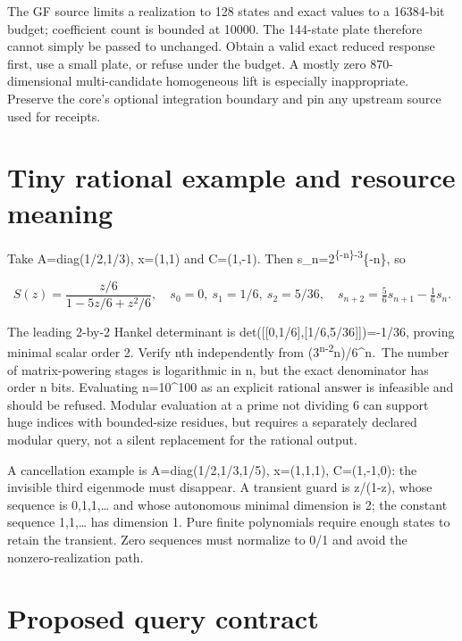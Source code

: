 \documentclass[
  11pt,
  a4paper,
]{report}
\let\nxtexttt\texttt
\renewcommand{\texttt}[1]{\nxtexttt{\seqsplit{#1}}}
\begin{document}
The GF source limits a realization to 128 states and exact values to a
16384-bit budget; coefficient count is bounded at 10000. The 144-state
plate therefore cannot simply be passed to \texttt{from\_state}
unchanged. Obtain a valid exact reduced response first, use a small
plate, or refuse under the budget. A mostly zero 870-dimensional
multi-candidate homogeneous lift is especially inappropriate. Preserve
the core's optional integration boundary and pin any upstream source
used for receipts.

\hypertarget{tiny-rational-example-and-resource-meaning}{%
\section{Tiny rational example and resource
meaning}\label{tiny-rational-example-and-resource-meaning}}

Take A=diag(1/2,1/3), x=(1,1) and C=(1,-1). Then
s\_n=2\textsuperscript{\{-n\}-3}\{-n\}, so

\[
S(z)=\frac{z/6}{1-5z/6+z^2/6},\quad s_0=0,\ s_1=1/6,\ s_2=5/36,
\quad s_{n+2}=\tfrac56s_{n+1}-\tfrac16s_n.
\]

The leading 2-by-2 Hankel determinant is
det({[}{[}0,1/6{]},{[}1/6,5/36{]}{]})=-1/36, proving minimal scalar
order 2. Verify nth independently from
(3\textsuperscript{n-2}n)/6\^{}n.~The number of matrix-powering stages
is logarithmic in n, but the exact denominator has order n bits.
Evaluating n=10\^{}100 as an explicit rational answer is infeasible and
should be refused. Modular evaluation at a prime not dividing 6 can
support huge indices with bounded-size residues, but requires a
separately declared modular query, not a silent replacement for the
rational output.

A cancellation example is A=diag(1/2,1/3,1/5), x=(1,1,1), C=(1,-1,0):
the invisible third eigenmode must disappear. A transient guard is
z/(1-z), whose sequence is 0,1,1,\ldots{} and whose autonomous minimal
dimension is 2; the constant sequence 1,1,\ldots{} has dimension 1. Pure
finite polynomials require enough states to retain the transient. Zero
sequences must normalize to 0/1 and avoid the nonzero-realization path.

\hypertarget{proposed-query-contract}{%
\section{Proposed query contract}\label{proposed-query-contract}}
\end{document}
